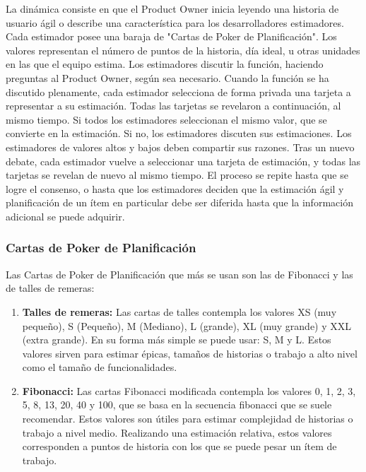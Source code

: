 La dinámica consiste en que el Product Owner inicia leyendo una historia de usuario ágil o describe una característica para los desarrolladores estimadores. Cada estimador posee una baraja de "Cartas de Poker de Planificación". Los valores representan el número de puntos de la historia, día ideal, u otras unidades en las que el equipo estima. Los estimadores discutir la función, haciendo preguntas al Product Owner, según sea necesario. Cuando la función se ha discutido plenamente, cada estimador selecciona de forma privada una tarjeta a representar a su estimación. Todas las tarjetas se revelaron a continuación, al mismo tiempo. Si todos los estimadores seleccionan el mismo valor, que se convierte en la estimación. Si no, los estimadores discuten sus estimaciones. Los estimadores de valores altos y bajos deben compartir sus razones. Tras un nuevo debate, cada estimador vuelve a seleccionar una tarjeta de estimación, y todas las tarjetas se revelan de nuevo al mismo tiempo. El proceso se repite hasta que se logre el consenso, o hasta que los estimadores deciden que la estimación ágil y planificación de un ítem en particular debe ser diferida hasta que la información adicional se puede adquirir.


\subsubsection{Cartas de Poker de Planificación}

Las Cartas de Poker de Planificación que más se usan son las de Fibonacci y las de talles de remeras:

\begin{enumerate}

\item \textbf{Talles de remeras:} Las cartas de talles contempla los valores XS (muy pequeño), S (Pequeño), M (Mediano), L (grande), XL (muy grande) y XXL (extra grande). En su forma más simple se puede usar: S, M y L. Estos valores sirven para estimar épicas, tamaños de historias o trabajo a alto nivel como el tamaño de funcionalidades. 

\item \textbf{Fibonacci:} Las cartas Fibonacci modificada contempla los valores 0, 1, 2, 3, 5, 8, 13, 20, 40 y 100, que se basa en la secuencia fibonacci que se suele recomendar. Estos valores son útiles para estimar complejidad de historias o trabajo a nivel medio. Realizando una estimación relativa, estos valores corresponden a puntos de historia con los que se puede pesar un ítem de trabajo.

\end{enumerate}

